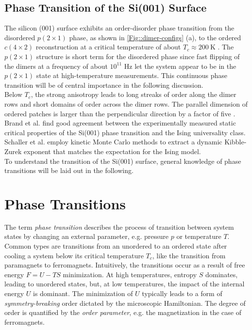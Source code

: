 	\section{Phase Transition of the Si(001) Surface}
	The silicon (001) surface exhibits an order-disorder phase transition from the disordered $p(2\times1)$ phase, as shown in \autoref{Fig::dimer-configs} (a), to the ordered $c(4\times2)$ reconstruction at a critical temperature of about $T_c \approx 200~\text{K}$ \cite{tabata1987order, brand2023dimer}. The $p(2\times1)$ structure is short term for the disordered phase since fast flipping of the dimers at a frequency of about $ 10^{11} \text{ Hz}$ \cite{dabrowski1992self} let the system appear to be in the $p(2\times1)$ state at high-temperature measurements. This continuous phase transition will be of central importance in the following discussion.  \\
	
	Below $T_c$, the strong anisotropy leads to long streaks of order along the dimer rows and short domains of order across the dimer rows. The parallel dimension of ordered patches is larger than the perpendicular direction by a factor of five \cite{brand2023dimer}. Brand et al. \cite{brand2023critical, brand2023dimer} find good agreement between the experimentally measured static critical properties of the Si(001) phase transition and the Ising universality class. Schaller et al. \cite{schaller2023sequential} employ kinetic Monte Carlo methods \cite{bortz1975new} to extract a dynamic Kibble-Zurek exponent that matches the expectation for the Ising model. \\%
	
	To understand the transition of the Si(001) surface, general knowledge of phase transitions will be laid out in the following.
	\chapter{Phase Transitions} \label{Chapter::Phase-Transitions}
	
	The term \textit{phase transition} describes the process of transition between system states by changing an external parameter, e.g. pressure $p$ or temperature $T$. Common types are transitions from an unordered to an ordered state after cooling a system below its critical temperature $T_c$, like the transition from paramagnets to ferromagnets. Intuitively, the transitions occur as a result of free energy $F =	U - TS$ minimization. At high temperatures, entropy $S$ dominates, leading to unordered states, but, at low temperatures, the impact of the internal energy $U$ is dominant. The minimization of $U$ typically leads to a form of \textit{symmetry-breaking} order dictated by the microscopic Hamiltonian. The degree of order is quantified by the \textit{order parameter}, e.g. the magnetization in the case of ferromagnets. \\
	
